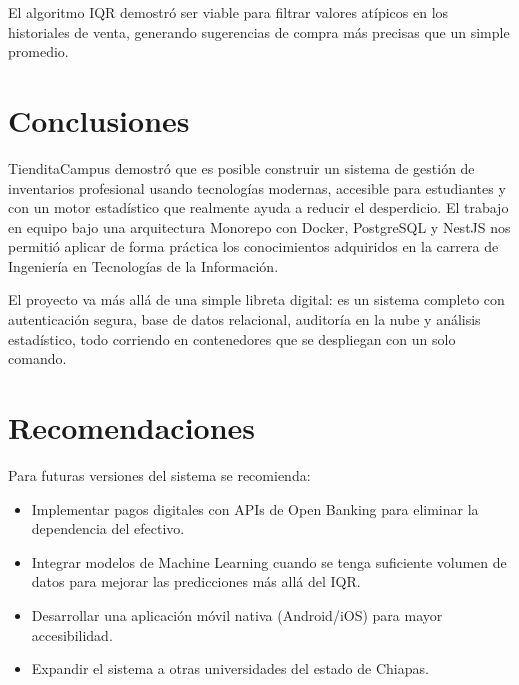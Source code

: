 \documentclass[12pt, a4paper]{article}
\begin{document}
El algoritmo IQR demostró ser viable para filtrar valores atípicos en los historiales de venta, generando sugerencias de compra más precisas que un simple promedio.

\section{Conclusiones}
TienditaCampus demostró que es posible construir un sistema de gestión de inventarios profesional usando tecnologías modernas, accesible para estudiantes y con un motor estadístico que realmente ayuda a reducir el desperdicio. El trabajo en equipo bajo una arquitectura Monorepo con Docker, PostgreSQL y NestJS nos permitió aplicar de forma práctica los conocimientos adquiridos en la carrera de Ingeniería en Tecnologías de la Información.

El proyecto va más allá de una simple libreta digital: es un sistema completo con autenticación segura, base de datos relacional, auditoría en la nube y análisis estadístico, todo corriendo en contenedores que se despliegan con un solo comando.

\section{Recomendaciones}
Para futuras versiones del sistema se recomienda:
\begin{itemize}
    \item Implementar pagos digitales con APIs de Open Banking para eliminar la dependencia del efectivo.
    \item Integrar modelos de Machine Learning cuando se tenga suficiente volumen de datos para mejorar las predicciones más allá del IQR.
    \item Desarrollar una aplicación móvil nativa (Android/iOS) para mayor accesibilidad.
    \item Expandir el sistema a otras universidades del estado de Chiapas.
\end{itemize}

\end{document}
